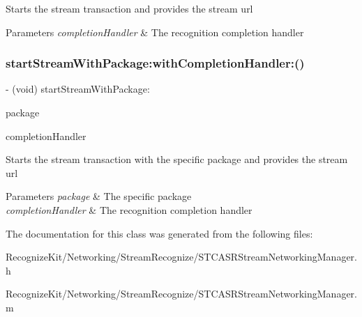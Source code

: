 Starts the stream transaction and provides the stream url 
\begin{DoxyParams}{Parameters}
{\em completion\+Handler} & The recognition completion handler \\
\hline
\end{DoxyParams}
\hypertarget{interface_s_t_c_a_s_r_stream_networking_manager_a221943cbf9a49b90a6e35fdb06bf4216}{}\label{interface_s_t_c_a_s_r_stream_networking_manager_a221943cbf9a49b90a6e35fdb06bf4216} 
\subsubsection{\texorpdfstring{start\+Stream\+With\+Package\+:with\+Completion\+Handler\+:()}{startStreamWithPackage:withCompletionHandler:()}}
{\footnotesize\ttfamily -\/ (void) start\+Stream\+With\+Package\+: \begin{DoxyParamCaption}\item[{(N\+S\+String $\ast$)}]{package }\item[{withCompletionHandler:(Completion\+Handler)}]{completion\+Handler }\end{DoxyParamCaption}}

Starts the stream transaction with the specific package and provides the stream url 
\begin{DoxyParams}{Parameters}
{\em package} & The specific package \\
\hline
{\em completion\+Handler} & The recognition completion handler \\
\hline
\end{DoxyParams}


The documentation for this class was generated from the following files\+:\begin{DoxyCompactItemize}
\item 
Recognize\+Kit/\+Networking/\+Stream\+Recognize/S\+T\+C\+A\+S\+R\+Stream\+Networking\+Manager.\+h\item 
Recognize\+Kit/\+Networking/\+Stream\+Recognize/S\+T\+C\+A\+S\+R\+Stream\+Networking\+Manager.\+m\end{DoxyCompactItemize}
